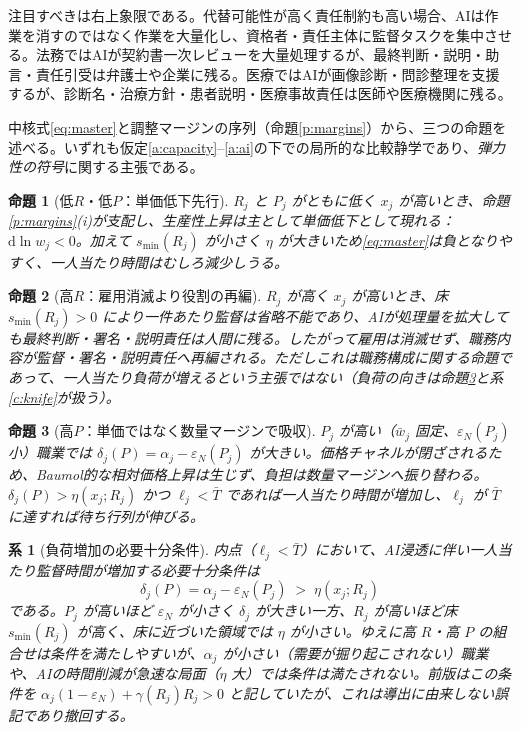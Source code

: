 \documentclass[11pt]{article}
\theoremstyle{plain}
\newtheorem{prop}{命題}
\newtheorem{cor}{系}
\theoremstyle{definition}
\theoremstyle{remark}
\begin{document}
注目すべきは右上象限である。代替可能性が高く責任制約も高い場合、AIは作業を消すのではなく作業を大量化し、資格者・責任主体に監督タスクを集中させる。法務ではAIが契約書一次レビューを大量処理するが、最終判断・説明・助言・責任引受は弁護士や企業に残る。医療ではAIが画像診断・問診整理を支援するが、診断名・治療方針・患者説明・医療事故責任は医師や医療機関に残る。

\medskip
中核式\eqref{eq:master}と調整マージンの序列（命題\ref{p:margins}）から、三つの命題を述べる。いずれも仮定\ref{a:capacity}--\ref{a:ai}の下での局所的な比較静学であり、\emph{弾力性の符号}に関する主張である。

\begin{prop}[低$R$・低$P$：単価低下先行]\label{p1}
$R_j$ と $P_j$ がともに低く $x_j$ が高いとき、命題\ref{p:margins}(i)が支配し、生産性上昇は主として単価低下として現れる：$\mathrm d\ln w_j<0$。加えて $s_{\min}(R_j)$ が小さく $\eta$ が大きいため\eqref{eq:master}は負となりやすく、一人当たり時間はむしろ減少しうる。
\end{prop}

\begin{prop}[高$R$：雇用消滅より役割の再編]\label{p2}
$R_j$ が高く $x_j$ が高いとき、床 $s_{\min}(R_j)>0$ により一件あたり監督は省略不能であり、AIが処理量を拡大しても最終判断・署名・説明責任は人間に残る。したがって雇用は消滅せず、職務内容が\emph{監督・署名・説明責任へ再編}される。ただしこれは職務構成に関する命題であって、一人当たり負荷が増えるという主張ではない（負荷の向きは命題\ref{p3}と系\ref{c:knife}が扱う）。
\end{prop}

\begin{prop}[高$P$：単価ではなく数量マージンで吸収]\label{p3}
$P_j$ が高い（$\bar w_j$ 固定、$\varepsilon_N(P_j)$ 小）職業では $\delta_j(P)=\alpha_j-\varepsilon_N(P_j)$ が大きい。価格チャネルが閉ざされるため、Baumol的な相対価格上昇は生じず、負担は数量マージンへ振り替わる。$\delta_j(P)>\eta(x_j;R_j)$ かつ $\ell_j<\bar T$ であれば一人当たり時間が増加し、$\ell_j$ が $\bar T$ に達すれば待ち行列が伸びる。
\end{prop}

\begin{cor}[負荷増加の必要十分条件]\label{c1}
内点（$\ell_j<\bar T$）において、AI浸透に伴い一人当たり監督時間が増加する必要十分条件は
\[
\delta_j(P)=\alpha_j-\varepsilon_N(P_j)\;>\;\eta(x_j;R_j)
\]
である。$P_j$ が高いほど $\varepsilon_N$ が小さく $\delta_j$ が大きい一方、$R_j$ が高いほど床 $s_{\min}(R_j)$ が高く、床に近づいた領域では $\eta$ が小さい。ゆえに高 $R$・高 $P$ の組合せは条件を満たしやすいが、$\alpha_j$ が小さい（需要が掘り起こされない）職業や、AIの時間削減が急速な局面（$\eta$ 大）では条件は満たされない。前版はこの条件を $\alpha_j(1-\varepsilon_N)+\gamma(R_j)R_j>0$ と記していたが、これは導出に由来しない誤記であり撤回する。
\end{cor}
\end{document}

